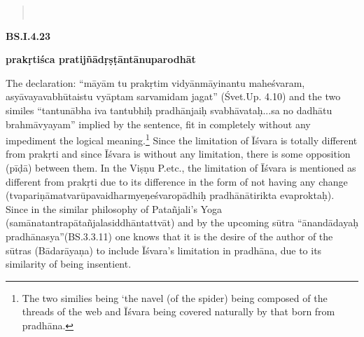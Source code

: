 \newpage

\textbf{}

\begin{verse}
\\
\end{verse}



\textbf{BS.I.4.23}

\textbf{prakṛtiśca pratijñādṛṣṭāntānuparodhāt}

The  declaration: “māyām tu prakṛtim vidyānmāyinantu maheśvaram, asyāvayavabhūtaistu vyāptam sarvamidam jagat” (Śvet.Up. 4.10) and the two similes “tantunābha iva tantubhiḥ pradhānjaiḥ svabhāvataḥ...\-sa no dadhātu brahmāvyayam” implied by the sentence, fit in completely without any impediment the logical meaning.\footnote{The two similies being ‘the navel (of the spider) being composed of the  threads  of the web and Īśvara being covered naturally by that born from pradhāna.} Since the limitation of Īśvara is totally different from prakṛti and since Īśvara is without any limitation, there is some opposition (pīḍā) between them. In the Viṣṇu P.etc., the limitation of Īśvara is mentioned as different from prakṛti due to its difference in the form of not having any change (tvapariṇāmatvarūpavaidharmyeṇeśvaropādhiḥ pradhānātirikta eva\break proktaḥ).  Since in the similar philosophy of Patañjali’s Yoga  (samānatantrapātañjalasiddhāntattvāt) and by the upcoming sūtra “ānandādayaḥ pradhānasya”(BS.3.3.11) one knows that it is the desire of the author of the sūtras (Bādarāyaṇa) to include Īśvara’s limitation in pradhāna, due to its similarity of being insentient.

